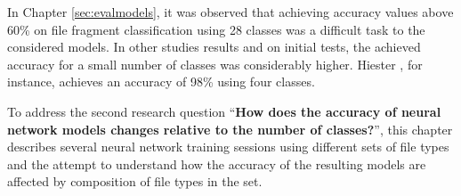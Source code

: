 In Chapter \ref{sec:evalmodels}, it was observed that achieving accuracy values above 60\% on file fragment classification using 28 classes was a difficult task to the considered models. In other studies results \cite{hiester_file_2018} \cite{sportiello_context-based_2012} \cite{amirani_feature-based_2013} \cite{maslim_distributed_2014} and on initial tests, the achieved accuracy for a small number of classes was considerably higher. Hiester \cite{hiester_file_2018}, for instance, achieves an accuracy of 98\% using four classes.

{\color{red}
To address the second research question 
``\textbf{How does the accuracy of neural network models changes relative to the number of classes?}'', 
this chapter describes several neural network training sessions using different sets of file types and the attempt to understand how the accuracy of the resulting models are affected by composition of file types in the set.
}